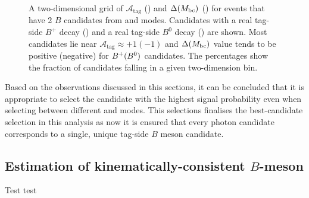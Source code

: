 \begin{figure}[htbp!]
    \centering
    \caption{\label{fig:selecting_tag_mode} A two-dimensional grid of $\mathcal{A}_{\mathrm{tag}}$ ()
    and $\Delta({M_{\mathrm{bc}}})$ () for events that have 2 $B$ candidates from \feiBp and \feiBz modes.
    Candidates with a real tag-side $B^+$ decay ()
    and a real tag-side $B^0$ decay () are shown.
    Most candidates lie near $\mathcal{A}_{\mathrm{tag}}\approx +1 (-1)$ and
    $\Delta({M_{\mathrm{bc}}})$ value tends to be positive (negative) for $B^+(B^0)$ candidates.
    The percentages show the fraction of candidates falling in a given two-dimension bin.
    }
\end{figure}

Based on the observations discussed in this sections, it can be concluded that it is appropriate to select the \FEI candidate with the highest signal probability even when selecting between different \feiBp and \feiBz modes.
This selections finalises the best-candidate selection in this analysis as now it is ensured that every photon candidate corresponds to a single, unique tag-side $B$ meson candidate.

\subsection{Estimation of kinematically-consistent \texorpdfstring{$B$}{B}-meson}\label{sec:good_tag_definition}

Test test